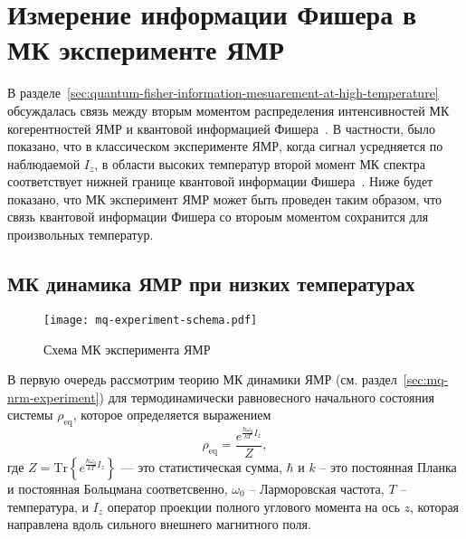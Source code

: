 \chapter{Измерение информации Фишера в МК эксперименте ЯМР}
\label{chapter:quantum-fisher-information-measurement}

В разделе~\ref{sec:quantum-fisher-information-mesuarement-at-high-temperature}
обсуждалась связь между вторым моментом распределения интенсивностей МК когерентностей ЯМР и квантовой информацией Фишера~\cite{Toth2014,Pezze2018}.
В частности, было показано,
что в классическом эксперименте ЯМР, когда сигнал усредняется по наблюдаемой $I_z$, в области высоких температур второй момент МК спектра соответствует нижней границе квантовой информации Фишера~\cite{Garttner2018}.
Ниже будет показано, что МК эксперимент ЯМР может быть проведен таким образом,
что связь квантовой информации Фишера со второым моментом сохранится для произвольных температур.


\section{МК динамика ЯМР при низких температурах}
\begin{figure}[H]
  \centering
  \texttt{[image: mq-experiment-schema.pdf]}
  \caption{Схема МК эксперимента ЯМР}
  \label{fig:mq-experiment-schema}
\end{figure}

В первую очередь рассмотрим теорию МК динамики ЯМР (см. раздел~\ref{sec:mq-nrm-experiment})
для термодинамически равновесного начального состояния системы $\rho_\mathrm{eq}$,
которое определяется выражением
%
\begin{equation}
  \label{eq:rho_eq}
  \rho_{\mathrm{eq}} = \dfrac{e^{\frac{\hbar\omega_{0}}{kT} I_z}}{Z},
\end{equation}
%
где $Z =\mathrm{Tr}\left\{e^{\frac{\hbar\omega_{0}}{kT} I_z}\right\}$ 
--- это статистическая сумма,
$\hbar$ и $k$ -- это постоянная Планка и постоянная Больцмана соответсвенно,
$\omega_0$ -- Ларморовская частота,
$T$ -- температура,
и $I_z$ оператор проекции полного углового момента на ось $z$,
которая направлена вдоль сильного внешнего магнитного поля.

